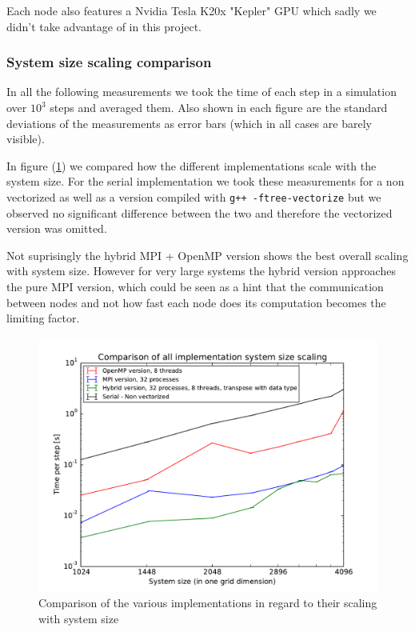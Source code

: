 \documentclass[11pt,a4paper]{article} %
\begin{document}
Each node also features a Nvidia Tesla K20x "Kepler" GPU which sadly we didn't take advantage of in this project.

\subsubsection{System size scaling comparison}

In all the following measurements we took the time of each step in a simulation over $10^{3}$ steps and averaged them. 
Also shown in each figure are the standard deviations of the measurements as error bars (which in all cases are barely visible).

In figure (\ref{fig:system_size_scaling}) we compared how the different implementations scale with the system size.
For the serial implementation we took these measurements for a non vectorized as well as a version compiled with \texttt{g++ -ftree-vectorize} but we observed no significant difference between the two and therefore the vectorized version was omitted.

Not suprisingly the hybrid MPI + OpenMP version shows the best overall scaling with system size.
However for very large systems the hybrid version approaches the pure MPI version, which could be seen as a hint that the communication between nodes and not how fast each node does its computation becomes the limiting factor.

\begin{figure}
\includegraphics[width=\textwidth]{comparison_system_size_scaling.pdf}
\caption{Comparison of the various implementations in regard to their scaling with system size}
\label{fig:system_size_scaling}
\end{figure}
\end{document}
